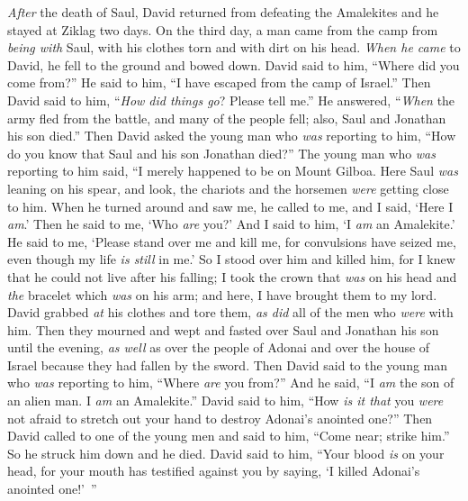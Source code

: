
\begin{biblechapter} %
 \textit{After} the death of Saul, David returned from defeating the Amalekites and he stayed at Ziklag two days.
\verse On the third day, a man came from the camp from \textit{being with} Saul, with his clothes torn and with dirt on his head. \textit{When he came} to David, he fell to the ground and bowed down.
\verse David said to him, “Where did you come from?” He said to him, “I have escaped from the camp of Israel.”
\verse Then David said to him, “\textit{How did things go}? Please tell me.” He answered, “\textit{When} the army fled from the battle, and many of the people fell; also, Saul and Jonathan his son died.”
\verse Then David asked the young man who \textit{was} reporting to him, “How do you know that Saul and his son Jonathan died?”
\verse The young man who \textit{was} reporting to him said, “I merely happened to be on Mount Gilboa. Here Saul \textit{was} leaning on his spear, and look, the chariots and the horsemen \textit{were} getting close to him.
\verse When he turned around and saw me, he called to me, and I said, ‘Here I \textit{am}.’
\verse Then he said to me, ‘Who \textit{are} you?’ And I said to him, ‘I \textit{am} an Amalekite.’
\verse He said to me, ‘Please stand over me and kill me, for convulsions have seized me, even though my life \textit{is still} in me.’
\verse So I stood over him and killed him, for I knew that he could not live after his falling; I took the crown that \textit{was} on his head and \textit{the} bracelet which \textit{was} on his arm; and here, I have brought them to my lord.
\verse David grabbed \textit{at} his clothes and tore them, \textit{as did} all of the men who \textit{were} with him.
\verse Then they mourned and wept and fasted over Saul and Jonathan his son until the evening, \textit{as well} as over the people of Adonai and over the house of Israel because they had fallen by the sword.
\verse Then David said to the young man who \textit{was} reporting to him, “Where \textit{are} you from?” And he said, “I \textit{am} the son of an alien man. I \textit{am} an Amalekite.”
\verse David said to him, “How \textit{is it that} you \textit{were} not afraid to stretch out your hand to destroy Adonai’s anointed one?”
\verse Then David called to one of the young men and said to him, “Come near; strike him.” So he struck him down and he died.
\verse David said to him, “Your blood \textit{is} on your head, for your mouth has testified against you by saying, ‘I killed Adonai’s anointed one!’ ”

\end{biblechapter}
